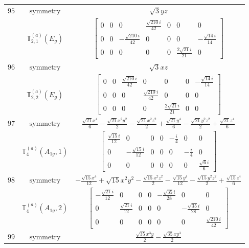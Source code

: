 \documentclass[fleqn,8pt,landscape]{jsarticle}
\begin{document}
\begin{longtable}{ccc}
$ 95 $ & $ \text{symmetry} $ & $ \sqrt{3} y z $ \\
$  $ & $ \mathbb{T}_{2,1}^{(a)}(E_{g}) $ & $ \begin{bmatrix} 0 & 0 & 0 & \frac{\sqrt{210} i}{42} & 0 & 0 & 0 \\ 0 & 0 & - \frac{\sqrt{210} i}{42} & 0 & 0 & 0 & - \frac{\sqrt{14} i}{14} \\ 0 & 0 & 0 & 0 & 0 & \frac{2 \sqrt{21} i}{21} & 0 \end{bmatrix} $ \\ \hline
$ 96 $ & $ \text{symmetry} $ & $ \sqrt{3} x z $ \\
$  $ & $ \mathbb{T}_{2,2}^{(a)}(E_{g}) $ & $ \begin{bmatrix} 0 & 0 & \frac{\sqrt{210} i}{42} & 0 & 0 & 0 & - \frac{\sqrt{14} i}{14} \\ 0 & 0 & 0 & \frac{\sqrt{210} i}{42} & 0 & 0 & 0 \\ 0 & 0 & 0 & 0 & \frac{2 \sqrt{21} i}{21} & 0 & 0 \end{bmatrix} $ \\ \hline
$ 97 $ & $ \text{symmetry} $ & $ \frac{\sqrt{21} x^{4}}{6} - \frac{\sqrt{21} x^{2} y^{2}}{2} - \frac{\sqrt{21} x^{2} z^{2}}{2} + \frac{\sqrt{21} y^{4}}{6} - \frac{\sqrt{21} y^{2} z^{2}}{2} + \frac{\sqrt{21} z^{4}}{6} $ \\
$  $ & $ \mathbb{T}_{4}^{(a)}(A_{1g},1) $ & $ \begin{bmatrix} \frac{\sqrt{15} i}{12} & 0 & 0 & 0 & - \frac{i}{4} & 0 & 0 \\ 0 & - \frac{\sqrt{15} i}{12} & 0 & 0 & 0 & - \frac{i}{4} & 0 \\ 0 & 0 & 0 & 0 & 0 & 0 & \frac{\sqrt{6} i}{6} \end{bmatrix} $ \\ \hline
$ 98 $ & $ \text{symmetry} $ & $ - \frac{\sqrt{15} x^{4}}{12} + \sqrt{15} x^{2} y^{2} - \frac{\sqrt{15} x^{2} z^{2}}{2} - \frac{\sqrt{15} y^{4}}{12} - \frac{\sqrt{15} y^{2} z^{2}}{2} + \frac{\sqrt{15} z^{4}}{6} $ \\
$  $ & $ \mathbb{T}_{4}^{(a)}(A_{1g},2) $ & $ \begin{bmatrix} - \frac{\sqrt{21} i}{12} & 0 & 0 & 0 & - \frac{\sqrt{35} i}{28} & 0 & 0 \\ 0 & \frac{\sqrt{21} i}{12} & 0 & 0 & 0 & - \frac{\sqrt{35} i}{28} & 0 \\ 0 & 0 & 0 & 0 & 0 & 0 & \frac{\sqrt{210} i}{42} \end{bmatrix} $ \\ \hline
$ 99 $ & $ \text{symmetry} $ & $ \frac{\sqrt{35} x^{3} y}{2} - \frac{\sqrt{35} x y^{3}}{2} $ \\

\end{longtable}
\end{document}
